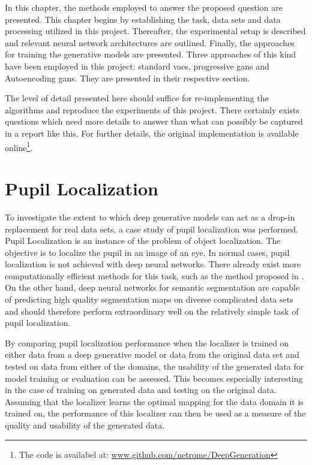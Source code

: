In this chapter, the methods employed to answer the proposed question are presented. This chapter begins by establishing the task, data sets and data processing utilized in this project. Thereafter, the experimental setup is described and relevant neural network architectures are outlined. Finally, the approaches for training the generative models are presented. Three approaches of this kind have been employed in this project: standard \acrfull{vaes}, progressive \acrfull{gans} and Autoencoding \acrfull{gans}. They are presented in their respective section. 

The level of detail presented here should suffice for re-implementing the algorithms and reproduce the experiments of this project. There certainly exists questions which need more details to answer than what can possibly be captured in a report like this. For further details, the original implementation is available online\footnote{The code is availabel at: \url{www.github.com/netrome/DeepGeneration}}.

\section{Pupil Localization}
To investigate the extent to which deep generative models can act as a drop-in replacement for real data sets, a case study of pupil localization was performed. Pupil Localization is an instance of the problem of object localization. The objective is to localize the pupil in an image of an eye. In normal cases, pupil localization is not achieved with deep neural networks. There already exist more computationally efficient methods for this task, such as the method proposed in \parencite{markuvs2014eye}. On the other hand, deep neural networks for semantic segmentation are capable of predicting high quality segmentation maps on diverse complicated data sets \parencite{ChenPK0Y16semantic} and should therefore perform extraordinary well on the relatively simple task of pupil localization.

By comparing pupil localization performance when the localizer is trained on either data from a deep generative model or data from the original data set and tested on data from either of the domains, the usability of the generated data for model training or evaluation can be assessed. This becomes especially interesting in the case of training on generated data and testing on the original data. Assuming that the localizer learns the optimal mapping for the data domain it is trained on, the performance of this localizer can then be used as a measure of the quality and usability of the generated data. 


